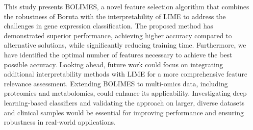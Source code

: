 This study presents BOLIMES, a novel feature selection algorithm that combines the robustness of Boruta with the interpretability of LIME to address the challenges in gene expression classification. The proposed method has demonstrated superior performance, achieving higher accuracy compared to alternative solutions, while significantly reducing training time. Furthermore, we have identified the optimal number of features necessary to achieve the best possible accuracy. Looking ahead, future work could focus on integrating additional interpretability methods with LIME for a more comprehensive feature relevance assessment. Extending BOLIMES to multi-omics data, including proteomics and metabolomics, could enhance its applicability. Investigating deep learning-based classifiers and validating the approach on larger, diverse datasets and clinical samples would be essential for improving performance and ensuring robustness in real-world applications.